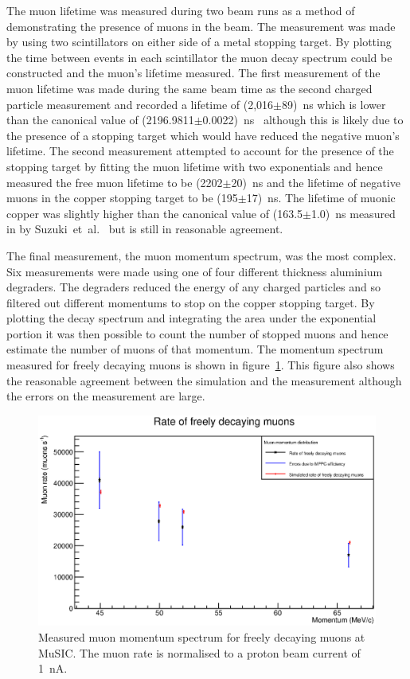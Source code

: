 The muon lifetime was measured during two beam runs as a method of demonstrating the presence of muons in the beam. The measurement was made by using two scintillators on either side of a metal stopping target. By plotting the time between events in each scintillator the muon decay spectrum could be constructed and the muon's lifetime measured. The first measurement of the muon lifetime was made during the same beam time as the second charged particle measurement and recorded a lifetime of (2,016\(\pm\)89)~ns which is lower than the canonical value of (2196.9811\(\pm\)0.0022)~ns~\cite{pdg} although this is likely due to the presence of a stopping target which would have reduced the negative muon's lifetime. The second measurement attempted to account for the presence of the stopping target by fitting the muon lifetime with two exponentials and hence measured the free muon lifetime to be (2202\(\pm\)20)~ns and the lifetime of negative muons in the copper stopping target to be (195\(\pm\)17)~ns. The lifetime of muonic copper was slightly higher than the canonical value of (163.5\(\pm\)1.0)~ns measured in by Suzuki~et~al.~\cite{suzuki_mu_capture_rates} but is still in reasonable agreement.

The final measurement, the muon momentum spectrum, was the most complex. Six measurements were made using one of four different thickness aluminium degraders. The degraders reduced the energy of any charged particles and so filtered out different momentums to stop on the copper stopping target. By plotting the decay spectrum and integrating the area under the exponential portion it was then possible to count the number of stopped muons and hence estimate the number of muons of that momentum. The momentum spectrum measured for freely decaying muons is shown in figure~\ref{fig:exec_summary_muon_momentum_spectrum}. This figure also shows the reasonable agreement between the simulation and the measurement although the errors on the measurement are large. 

\begin{figure}[htpb]
  \centering
    \includegraphics[width=.9\textwidth]{../3_measurements/images/plot_generating_scripts/adjusted_muon_rates_exec_summary_version.eps}
  \caption{Measured muon momentum spectrum for freely decaying muons at MuSIC. The muon rate is normalised to a proton beam current of 1~nA.}
  \label{fig:exec_summary_muon_momentum_spectrum}
\end{figure}


